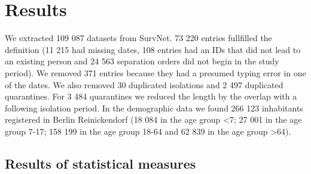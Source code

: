\documentclass[
]{article}
\newenvironment{Shaded}{\begin{snugshade}}{\end{snugshade}}
\newcommand{\FunctionTok}[1]{\textcolor[rgb]{0.00,0.00,0.00}{#1}}
\newcommand{\NormalTok}[1]{#1}
\newcommand{\OtherTok}[1]{\textcolor[rgb]{0.56,0.35,0.01}{#1}}
\newcommand{\SpecialCharTok}[1]{\textcolor[rgb]{0.00,0.00,0.00}{#1}}
\begin{document}
\hypertarget{results}{%
\section{Results}\label{results}}

\begin{Shaded}
\end{Shaded}

We extracted 109 087 datasets from SurvNet. 73 220 entries fullfilled
the definition (11 215 had missing dates, 108 entries had an IDs that
did not lead to an existing person and 24 563 separation orders did not
begin in the study period). We removed 371 entries because they had a
presumed typing error in one of the dates. We also removed 30 duplicated
isolations and 2 497 duplicated quarantines. For 3 484 quarantines we
reduced the length by the overlap with a following isolation period. In
the demographic data we found 266 123 inhabitants registered in Berlin
Reinickendorf (18 084 in the age group \textless7; 27 001 in the age
group 7-17; 158 199 in the age group 18-64 and 62 839 in the age group
\textgreater64).

\hypertarget{results-of-statistical-measures}{%
\subsection{Results of statistical
measures}\label{results-of-statistical-measures}}
\end{document}
